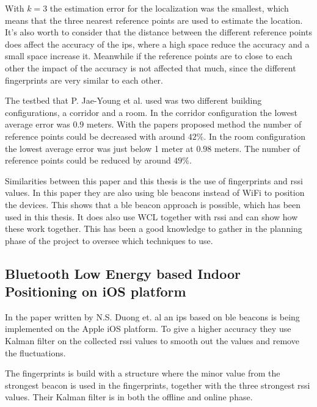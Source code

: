 \bigskip

With $k=3$ the estimation error for the localization was the smallest, which means that the three nearest reference points are used to estimate the location.
It's also worth to consider that the distance between the different reference points does affect the accuracy of the \acrshort{ips}, where a high space reduce the accuracy and a small space increase it.
Meanwhile if the reference points are to close to each other the impact of the accuracy is not affected that much, since the different fingerprints are very similar to each other.

\bigskip

The testbed that P. Jae-Young et al. used was two different building configurations, a corridor and a room.
In the corridor configuration the lowest average error was $0.9$ meters. 
With the papers proposed method the number of reference points could be decreased with around $42\%$.
In the room configuration the lowest average error was just below 1 meter at $0.98$ meters.
The number of reference points could be reduced by around $49\%$.

\bigskip

Similarities between this paper and this thesis is the use of fingerprints and \acrshort{rssi} values.
In this paper they are also using \acrshort{ble} beacons instead of WiFi to position the devices.
This shows that a \acrshort{ble} beacon approach is possible, which has been used in this thesis.
It does also use WCL together with \acrshort{rssi} and can show how these work together.
This has been a good knowledge to gather in the planning phase of the project to oversee which techniques to use.


\subsection{Bluetooth Low Energy based Indoor Positioning on iOS platform}\label{sec:}
In the paper \cite{BluetoothLowEnergy2018} written by N.S. Duong et. al an \acrshort{ips} based on \acrshort{ble} beacons is being implemented on the Apple iOS platform.
To give a higher accuracy they use Kalman filter on the collected \acrshort{rssi} values to smooth out the values and remove the fluctuations.

\bigskip

The fingerprints is build with a structure where the minor value from the strongest beacon is used in the fingerprints, together with the three strongest \acrshort{rssi} values.
Their Kalman filter is in both the offline and online phase.

